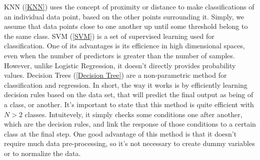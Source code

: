 KNN (\ref{KNN}) uses the concept of proximity or distance to make 
classifications of an individual data point, based on the other points surrounding it. Simply,
we assume that data points close to one another up until some threshold belong to the same class.
SVM (\ref{SVM}) is a set of supervised learning used for classification. One of its
advantages is its efficience in high dimensional spaces, even when the number of 
predictors is greater than the number of samples. However, unlike Logistic Regression,
it doesn't directly provides probability values. Decision Trees (\ref{Decision Tree})
are a non-parametric method for classification and regression. In short, the way it 
works is by efficiently learning decision rules based on the data set, that will
predict the final output as being of a class, or another. It's important to state 
that this method is quite efficient with $N>2$ classes. Intuitevely, it simply checks 
some conditions one after another, which are the decision rules, and link the response of those 
conditions to a certain class at the final step. One good advantage of this method is that it 
doesn't require much data pre-processing, so it's not necessary to create dummy variables or 
to normalize the data.  